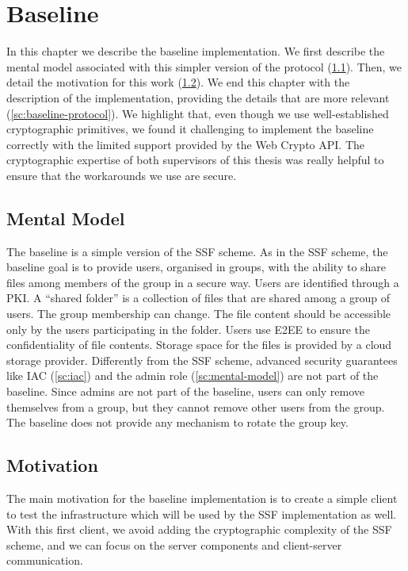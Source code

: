 \chapter{Baseline}\label{ch:baseline}

In this chapter we describe the baseline implementation.
We first describe the mental model
associated with this simpler version
of the protocol (\cref{sc:baseline-mental-model}).
Then, we detail the motivation for this work (\cref{sc:baseline-motivations}).
We end this chapter with the description of the
implementation, providing the details
that are more relevant (\cref{sc:baseline-protocol}).
We highlight that, even though we use well-established
cryptographic primitives, we found it
challenging to implement the baseline correctly
with the limited support provided by the
Web Crypto API.
The cryptographic expertise of both supervisors
of this thesis was really helpful to ensure that the
workarounds we use are secure.

\section{Mental Model}\label{sc:baseline-mental-model}
The baseline is a simple version of the SSF scheme.
As in the SSF scheme, the baseline 
goal is to provide users, organised in groups, with
the ability to share files among members of the group in
a secure way.
Users are identified through a PKI.
A ``shared folder'' is a collection of files that are shared 
among a group of users. 
The group membership can change.
The file content 
should be accessible only by the users participating 
in the folder. Users use E2EE to ensure the confidentiality
of file contents.
Storage space for the files is
provided by a cloud storage provider. 
Differently from the SSF scheme, advanced security guarantees
like IAC (\cref{sc:iac}) and the admin role (\cref{sc:mental-model}) are not part of the baseline.
Since admins are not part of the baseline, users can only remove themselves from a group, but they cannot remove other users from the group.
The baseline does not provide any mechanism to rotate the group key.

\section{Motivation}\label{sc:baseline-motivations}

The main motivation for the baseline implementation is
to create a simple client to test the infrastructure which 
will be used by the SSF implementation as well.
With this first client, we avoid adding the cryptographic
complexity of the SSF scheme, and we can focus
on the server components and client-server communication.

